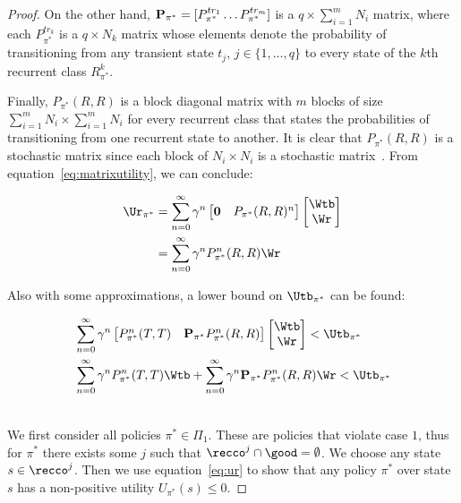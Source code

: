 \begin{proof}
On the other hand, ${\bf P_{\pi^*}} = [ P_{\pi^*}^{tr_1}\dotsc P_{\pi^*}^{tr_m}]$ is a $q \times \sum_{i=1}^m N_i$ matrix, where each $P_{\pi^*}^{tr_k}$ is a $q\times N_k$ matrix whose elements denote the probability of transitioning from any transient state $t_j$, $j\in \{ 1,\dotsc, q\}$ to every state of the $k$th recurrent class $R_{\pi^*}^k$.


Finally, $P_{\pi^*}(R,R)$ is a block diagonal matrix with $m$ blocks of size $\sum_{i=1}^m N_i \times \sum_{i=1}^m N_i$ for every recurrent class that states the probabilities of transitioning from one recurrent state to another. It is clear that $P_{\pi^*}(R,R)$ is a stochastic matrix since each block of $N_i \times N_i$ is a stochastic matrix~\cite{Durrett2012}.
From equation~\eqref{eq:matrixutility}, we can conclude:

\begin{align}
\label{eq:ur}
\Ur_{\pi^*} & = \sum_{n=0}^\infty \gamma^n 
\begin{bmatrix}
{\bf 0} & P_{\pi^*}(R,R)^n
\end{bmatrix}
\begin{bmatrix}
\Wtb \\
\Wr
\end{bmatrix}  \\
&= \sum_{n=0}^\infty \gamma^n P_{\pi^*}^n(R,R) \Wr 
 \end{align}

Also with some approximations, a lower bound on $\Utb_{\pi^*}$ can be found:

\begin{align}
\label{eq:ut}
&\sum_{n=0}^\infty \gamma^n
\begin{bmatrix}
P_{\pi^*}^n(T,T) & {\bf P}_{\pi^*} P_{\pi^*}^n(R,R)
\end{bmatrix}
\begin{bmatrix}
\Wtb \\
\Wr
\end{bmatrix} <  \Utb_{\pi^*}  \\
&\sum_{n=0}^{\infty} \gamma^n P_{\pi^*}^n(T,T) \Wtb + \sum_{n=0}^\infty \gamma^n {\bf P}_{\pi^*}P_{\pi^*}^n(R,R)\Wr < \Utb_{\pi^*} 
\end{align}

\\
We first consider all policies $\pi^* \in \Pi_1$. These are policies that violate case $1$, thus for $\pi^*$ there exists some $j$ such that $\recco^j \cap \good = \emptyset$. We choose any state $s \in \recco^j$.
Then we use equation~\eqref{eq:ur} to show that any policy $\pi^*$ over state $s$ has a non-positive utility $U_{\pi^*}(s) \leq 0$.


\end{proof}
